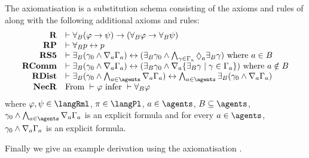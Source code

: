 \begin{definition}
    The axiomatisation \axiomRmlS{} is a substitution schema consisting of the axioms and rules of \axiomS{} along with the following additional axioms and rules:
$$
\begin{array}{rl}
    {\bf R} & \proves \allrefsBs (\phi \implies \psi) \implies (\allrefsBs \phi \implies \allrefsBs \psi)\\
    {\bf RP} & \proves \allrefsBs \atomP \iff \atomP\\
    {\bf RS5} & \proves \somerefsBs (\gamma_0 \land \coversA \Gamma_\agentA) \iff (\somerefsBs \gamma_0 \land \bigwedge_{\gamma \in \Gamma_\agentA} \possibleA \somerefsBs \gamma) \text{ where } \agentA \in \agentsB\\
    {\bf RComm} & \proves \somerefsBs (\gamma_0 \land \coversA \Gamma_\agentA) \iff (\somerefsBs \gamma_0 \land \coversA \{\somerefsBs \gamma \mid \gamma \in \Gamma_\agentA\}) \text{ where } \agentA \notin \agentsB\\
    {\bf RDist} & \proves \somerefsBs (\gamma_0 \land \bigwedge_{\agentA \in \agents} \coversA \Gamma_\agentA) \iff \bigwedge_{\agentA \in \agents} \somerefsBs (\gamma_0 \land \coversA \Gamma_\agentA)\\
    {\bf NecR} & \text{From } \proves \phi \text{ infer } \proves \allrefsBs \phi
\end{array}
$$
where $\phi, \psi \in \langRml$, $\pi \in \langPl$, $\agentA \in \agents$, $\agentsB \subseteq \agents$, $\gamma_0 \land \bigwedge_{\agentA \in \agents} \coversA \Gamma_\agentA$ is an explicit formula and for every $\agentA \in \agents$, $\gamma_0 \land \nabla_{a} \Gamma_a$ is an explicit formula.
\end{definition}

Finally we give an example derivation using the axiomatisation \axiomRmlS{}.

